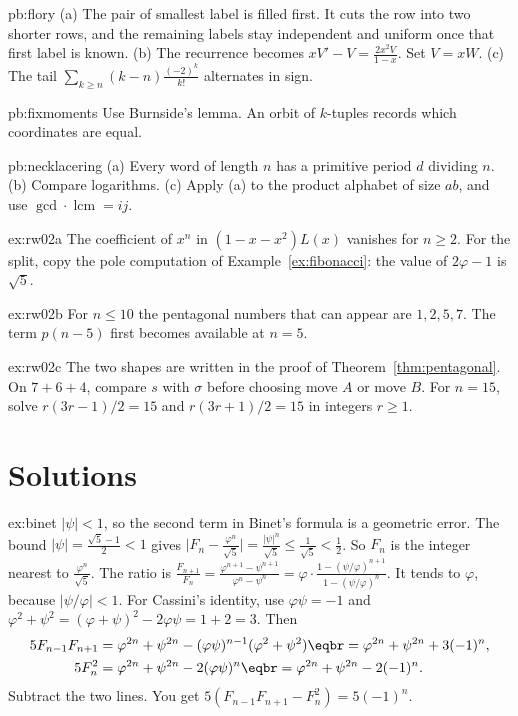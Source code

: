 \begin{hint}{pb:flory}
(a) The pair of smallest label is filled first. It cuts the row into two shorter rows, and the remaining labels stay independent and uniform once that first label is known. (b) The
recurrence becomes $xV'-V=\frac{2x^2V}{1-x}$. Set $V=xW$. (c) The tail $\sum_{k\ge n}(k-n)\frac{(-2)^k}{k!}$ alternates in sign.
\end{hint}

\begin{hint}{pb:fixmoments}
Use Burnside's lemma. An orbit of $k$-tuples records which coordinates are equal.
\end{hint}

\begin{hint}{pb:necklacering}
(a) Every word of length $n$ has a primitive period $d$ dividing $n$. (b) Compare logarithms. (c) Apply (a) to the product alphabet of size $ab$, and use $\gcd\cdot\operatorname{lcm}=ij$.
\end{hint}


\begin{hint}{ex:rw02a}
The coefficient of $x^n$ in $(1-x-x^2)L(x)$ vanishes for $n\ge2$. For the split, copy the pole computation of Example~\ref{ex:fibonacci}: the value of $2\varphi-1$ is $\sqrt5$.
\end{hint}
\begin{hint}{ex:rw02b}
For $n\le10$ the pentagonal numbers that can appear are $1,2,5,7$. The term $p(n-5)$ first becomes available at $n=5$.
\end{hint}
\begin{hint}{ex:rw02c}
The two shapes are written in the proof of Theorem~\ref{thm:pentagonal}. On $7+6+4$, compare $s$ with $\sigma$ before choosing move $A$ or move $B$. For $n=15$, solve $r(3r-1)/2=15$ and $r(3r+1)/2=15$ in integers $r\ge1$.
\end{hint}

\section{Solutions}

\begin{solution}{ex:binet}
\idea $|\psi|<1$, so the second term in Binet's formula is a geometric error.
\writeup The bound $|\psi|=\frac{\sqrt5-1}2<1$ gives
$\bigl|F_n-\frac{\varphi^n}{\sqrt5}\bigr|=\frac{|\psi|^n}{\sqrt5}\le\frac1{\sqrt5}<\frac12$.
So $F_n$ is the integer nearest to $\frac{\varphi^n}{\sqrt5}$. The ratio is
$\frac{F_{n+1}}{F_n}=\frac{\varphi^{n+1}-\psi^{n+1}}{\varphi^n-\psi^n}=\varphi\cdot\frac{1-(\psi/\varphi)^{n+1}}{1-(\psi/\varphi)^n}$.
It tends to $\varphi$, because $|\psi/\varphi|<1$. For Cassini's identity, use $\varphi\psi=-1$ and $\varphi^2+\psi^2=(\varphi+\psi)^2-2\varphi\psi=1+2=3$. Then
\[
\begin{aligned}5F_{n-1}F_{n+1}&=\varphi^{2n}+\psi^{2n}-(\varphi\psi)^{n-1}(\varphi^2+\psi^2)\eqbr=\varphi^{2n}+\psi^{2n}+3(-1)^n,\\
5F_n^2&=\varphi^{2n}+\psi^{2n}-2(\varphi\psi)^n\eqbr=\varphi^{2n}+\psi^{2n}-2(-1)^n.\end{aligned}
\]
Subtract the two lines. You get $5(F_{n-1}F_{n+1}-F_n^2)=5(-1)^n$.
\end{solution}

